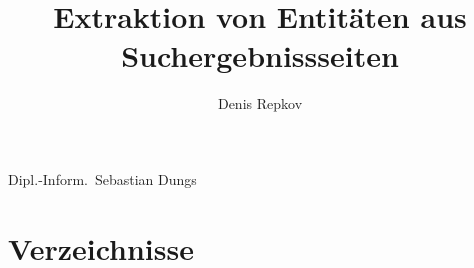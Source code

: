 \documentclass[
11pt,
titlepage,
a4paper,
abstracton,
twoside,
openright,
chapterprefix,
noappendixprefix,
headsepline,
footsepline,
cleardoubleplain,
bibtotoc,
liststotoc,
pointlessnumbers
]{scrreprt}
\begin{document}
\title{Extraktion von Entitäten aus Suchergebnissseiten}
\author{Denis Repkov}
{Dipl.-Inform.~Sebastian Dungs}

\maketitle

\setcounter{page}{2}
\begin{abstract}
\thispagestyle{plain}

\end{abstract}

\pagestyle{scrheadings}
\setcounter{tocdepth}{2}
\tableofcontents

\cleardoublepage
{}
\pagestyle{scrheadings}
\sloppy


%
%




%

\cleardoublepage
\part*{Verzeichnisse}



%
\end{document}
